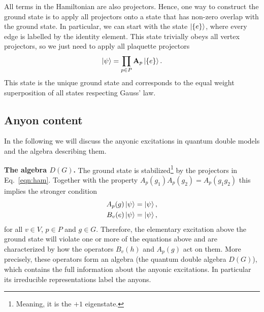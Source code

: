 \documentclass[two column]{article}
\begin{document}

All terms in the Hamiltonian are also projectors. Hence, one way to construct the ground state is to apply all projectors onto a state that has non-zero overlap with the ground state. In particular, we can start with the state $\ket{\{e\}}$, where every edge is labelled by the identity element.
This state trivially obeys all vertex projectors, so we just need to apply all plaquette projectors
\begin{equation}
    \ket{\psi} = \prod_{p \in P} \mathbf A_p \ket{\{e\}}.
\end{equation}
This state is the unique ground state and corresponds to the equal weight superposition of all states respecting Gauss' law.




\subsection{Anyon content}\label{sec:anyon}
In the following we will discuss the anyonic excitations in quantum double models and the algebra describing them.

\textbf{The algebra $D(G)$.} The ground state is stabilized\footnote{Meaning, it is the $+1$ eigenstate.} by the projectors in Eq.~\eqref{eqn:ham}. Together with the property $A_p{(g_1)}A_p{(g_2)} = A_p{(g_1 g_2)}$ this implies the stronger condition
\begin{equation}
\begin{split}
    A_p{(g)} \ket{\psi} = \ket{\psi},\\
    B_v{(e)} \ket{\psi} = \ket{\psi},
\end{split}\label{eqn:ground_state}
\end{equation}
for all $v \in V$, $p \in P$ and $g \in G$. Therefore, the elementary excitation above the ground state will violate one or more of the equations above and are characterized by how the operators $B_v(h)$ and $A_p(g)$ act on them. More precisely, these operators form an algebra\cite{cui2018topological, Kitaev_2003} (the quantum double algebra $D(G)$), which contains the full information about the anyonic excitations. In particular its irreducible representations label the anyons.
\end{document}
